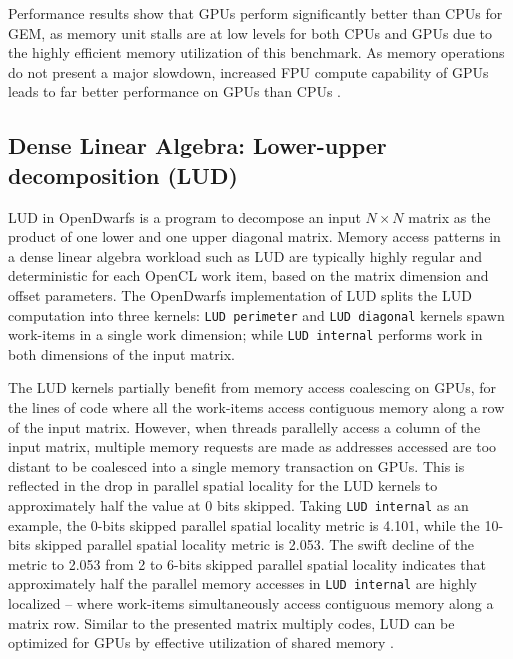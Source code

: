 \documentclass[review=false, sigchi]{acmart}
\begin{document}
	Performance results \cite{johnston18opendwarfs, krommydas2016opendwarfs} show that GPUs perform significantly better than CPUs for GEM, as memory unit stalls are at low levels for both CPUs and GPUs due to the highly efficient memory utilization of this benchmark. 
	As memory operations do not present a major slowdown, increased FPU compute capability of GPUs leads to far better performance on GPUs than CPUs \cite{krommydas2016opendwarfs}. 
	
	\subsection{Dense Linear Algebra: Lower-upper decomposition (LUD)}
	
	LUD in OpenDwarfs is a program to decompose an input $N\times N$ matrix as the product of one lower and one upper diagonal matrix. 
	Memory access patterns in a dense linear algebra workload such as LUD are typically highly regular and deterministic for each OpenCL work item, based on the matrix dimension and offset parameters. The OpenDwarfs implementation of LUD \cite{opendwarfs2020head} splits the LUD computation into three kernels: \texttt{LUD perimeter} and \texttt{LUD diagonal} kernels spawn work-items in a single work dimension; while \texttt{LUD internal} performs work in both dimensions of the input matrix.
	
	The LUD kernels partially benefit from memory access coalescing on GPUs, for the lines of code where all the work-items access contiguous memory along a row of the input matrix. 
	However, when threads parallelly access a column of the input matrix, multiple memory requests are made as addresses accessed are too distant to be coalesced into a single memory transaction on GPUs. 
	This is reflected in the drop in parallel spatial locality for the LUD kernels to approximately half the value at 0 bits skipped. Taking \texttt{LUD internal} as an example, the 0-bits skipped parallel spatial locality metric is 4.101, while the 10-bits skipped parallel spatial locality metric is 2.053. 
	The swift decline of the metric to 2.053 from 2 to 6-bits skipped parallel spatial locality indicates that approximately half the parallel memory accesses in \texttt{LUD internal} are highly localized -- where work-items simultaneously access contiguous memory along a matrix row. 
	Similar to the presented matrix multiply codes, LUD can be optimized for GPUs by effective utilization of shared memory \cite{opendwarfs2020head}.
	
	
\end{document}
